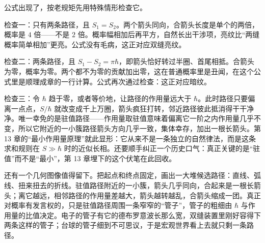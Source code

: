 公式出现了，按老规矩先用特殊情形检查它。

检查一：只有两条路径，且 \(S_1=S_2\)。两个箭头同向，合箭头长度是单个的两倍，概率是 \(4\) 倍——不是 \(2\) 倍。概率幅相加后再平方，自然长出干涉项，亮纹比“两缝概率简单相加”更亮。公式没有毛病，这正对应双缝亮纹。

检查二：两条路径，且 \(S_1-S_2=\pi\hbar\)，即箭头恰好转过半圈、首尾相抵。合箭头为零，概率为零。两个都不为零的贡献加出零，这在普通概率里是丑闻，在这个公式里是顺理成章的一行计算。公式再次通过检查：这正对应暗纹。

检查三：令 \(\hbar\) 趋于零，或者等价地，让路径的作用量远大于 \(\hbar\)。此时路径只要偏离一点点，\(S/\hbar\) 就改变成千上万圈，箭头疯狂打转，邻近路径彼此抵消得干干净净。唯一幸免的是驻值路径——作用量取驻值意味着偏离它一阶之内作用量几乎不变，所以它附近的一小簇路径箭头方向几乎一致，集体幸存，加出一根长箭头。第 13 章的“最小作用量原理”就此显形：它从来不是一条独立的自然律法，而是这条求和规则在 \(S\gg\hbar\) 时的近似长相。还要顺手纠正一个历史口气：真正关键的是“驻值”而不是“最小”，第 13 章埋下的这个伏笔在此回收。

还有一个几何图像值得留下。把起点和终点固定，画出一大堆候选路径：直线、弧线、扭来扭去的折线。驻值路径附近的一小簇，箭头几乎同向，合起来是一根长箭头；离它越远，相邻路径的作用量差越大，箭头越转越乱，合箭头缩成一团。真正对概率有发言权的，只是驻值路径周围一条窄窄的“管子”，管子的粗细由 \(\hbar\) 与作用量的比值决定。电子的管子有它的德布罗意波长那么宽，双缝装置里刚好容得下两条这样的管子；台球的管子细到不可思议，于是宏观世界看上去就只剩一条路径。

\begin{center}
\end{center}

